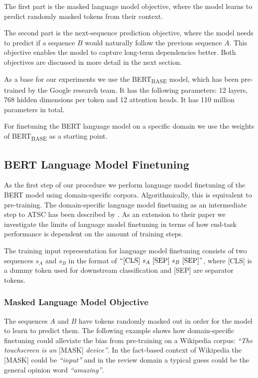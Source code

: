 \documentclass[11pt,a4paper]{article}
\newcommand{\rood}[1]{}
\begin{document}
The first part is the masked language model objective, where the model learns to predict randomly masked tokens from their context.

The second part is the next-sequence prediction objective, where the model needs to predict if a sequence $B$ would naturally follow the previous sequence $A$.
This objective enables the model to capture long-term dependencies better.
Both objectives are discussed in more detail in the next section.

As a base for our experiments we use the BERT\textsubscript{BASE} model, which has been pre-trained by the Google research team. It has the following parameters:
12 layers, 768 hidden dimensions per token and 12 attention heads. It has 110 million parameters in total.

For finetuning the BERT language model on a specific domain we use the weights of BERT\textsubscript{BASE} as a starting point.
\rood{For ATSC, an additional fully-connected layer on top of BERT with a softmax activation function is added.}

\subsection{BERT Language Model Finetuning}
\rood{Outcome: Readers should understand that we use language model (LM) finetuning
  (forget the 2 methods?!) as an intermediate step before classification
  Also they should understand that we try to optimize the number of iteration compared to previous work we would know the limit of significance of improvement.
}
As the first step of our procedure we perform language model finetuning of the BERT
model using domain-specific corpora. 
Algorithmically, this is equivalent to pre-training.
The domain-specific language model finetuning as an intermediate step to ATSC has been described by \citet{Xu2019}. As an extension to their paper we investigate the limits of language model finetuning in terms of how end-task performance is dependent on the amount of training steps. 

The training input representation for language model finetuning consists of two sequences $s_A$ and $s_B$ in the format of $``\textrm{[CLS]} \ s_{A} \ \textrm{[SEP]} \ s_{B} \ \textrm{[SEP]}"$,
where 
\textrm{[CLS]} is a dummy token used for downstream classification and \textrm{[SEP]} are separator tokens.
\subsubsection*{Masked Language Model Objective}
The sequences $A$ and $B$ have tokens randomly masked out in order for the model to learn to predict them. 
The following example shows how domain-specific finetuning could alleviate the 
bias from pre-training on a Wikipedia corpus:
\textit{``The touchscreen is an} [MASK] \textit{device''}. In the fact-based context of Wikipedia the [MASK] could be \textit{``input''} and in the review domain a typical guess could be the general opinion word \textit{``amazing''}.
\end{document}
